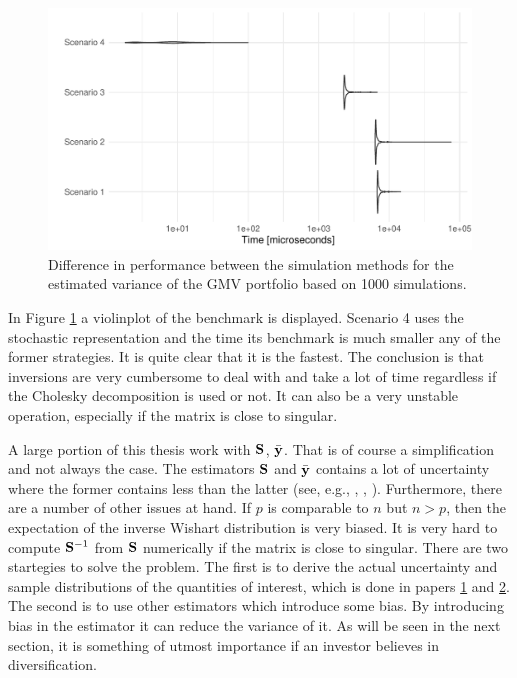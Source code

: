 \documentclass[12pt, oneside]{book}\usepackage{knitr}
\begin{document}
{\begin{knitrout}
\begin{figure}
{\centering \includegraphics[width=\maxwidth]{figure/microbenchmark_output-1} 

}

\caption[Difference in performance between the simulation methods for the estimated variance of the GMV portfolio based on 1000 simulations]{Difference in performance between the simulation methods for the estimated variance of the GMV portfolio based on 1000 simulations.}\label{fig:microbenchmark_output}
\end{figure}

\end{knitrout}

In Figure \ref{fig:microbenchmark_output} a violinplot of the benchmark is displayed.
Scenario 4 uses the stochastic representation and the time its benchmark is much smaller any of the former strategies.
It is quite clear that it is the fastest. 
The conclusion is that inversions are very cumbersome to deal with and take a lot of time regardless if the Cholesky decomposition is used or not.
It can also be a very unstable operation, especially if the matrix is close to singular.

A large portion of this thesis work with $\mathbf{S}$, $\bar{\mathbf{y}}$.
That is of course a simplification and not always the case.
The estimators $\mathbf{S}$ and $\bar{\mathbf{y}}$ contains a lot of uncertainty where the former contains less than the latter (see, e.g., \citet{frankfurter1971portfolio}, \citet{merton1980estimating}, \citet{best1991sensitivity}). 
Furthermore, there are a number of other issues at hand.
If $p$ is comparable to $n$ but $n>p$, then the expectation of the inverse Wishart distribution is very biased.
It is very hard to compute $\mathbf{S}^{-1}$ from $\mathbf{S}$ numerically if the matrix is close to singular.
There are two startegies to solve the problem.
The first is to derive the actual uncertainty and sample distributions of the quantities of interest, which is done in papers \hyperref[sec:paper1]{1} and \hyperref[sec:paper2]{2}.
The second is to use other estimators which introduce some bias.
By introducing bias in the estimator it can reduce the variance of it.
As will be seen in the next section, it is something of utmost importance if an investor believes in diversification.

}
\end{document}
